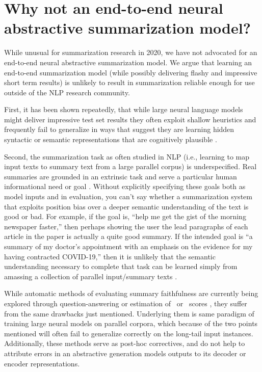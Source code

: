 \section{Why not an end-to-end neural abstractive summarization model?}

While unusual for summarization research in 2020, we have not advocated for an
end-to-end neural abstractive summarization model.  We argue that learning an
end-to-end summarization model (while possibly delivering flashy and
impressive short term results) is unlikely to result in summarization reliable
enough for use outside of the NLP research community.

First, it has been shown repeatedly, that while large neural language models
might deliver impressive test set results they often exploit shallow
heuristics and frequently fail to generalize in ways that suggest they are
learning hidden syntactic or semantic representations that are cognitively
plausible \citep{fodor1988,marcus2003,lake18,mccoy2019,linzen2020}.

Second, the summarization task as often studied in NLP (i.e., learning to map
input texts to summary text from a large parallel corpus) is underspecified.
Real summaries are grounded in an extrinsic task and serve a particular human
informational need or goal \citep{jones1999,mckeown2005}.  Without explicitly
specifying these goals both as model inputs and in evaluation, you can't say
whether a summarization system that exploits position bias over a deeper
semantic understanding of the text is good or bad. For example, if the goal
is, ``help me get the gist of the morning newspaper faster,'' then perhaps
showing the user the lead paragraphs of each article in the paper is actually
a quite good summary. If the intended goal is ``a summary of my doctor's
appointment with an emphasis on the evidence for my having contracted
COVID-19,'' then it is unlikely that the semantic understanding necessary to
complete that task can be learned simply from amassing a collection of
parallel input/summary texts \citep{bender2020,bisk2020}.

While automatic methods of evaluating summary faithfulness are currently being
explored through question-answering \citep{wang2020b,durmus2020} or estimation
of \rouge~or \bleu~scores \citep{zhang2020,sellam2020}, they suffer from the
same drawbacks just mentioned.  Underlying them is same paradigm of training
large neural models on parallel corpora, which because of the two points
mentioned will often fail to generalize correctly on the long-tail input
instances.  Additionally, these methods serve as post-hoc correctives, and do
not help to attribute errors in an abstractive generation models outputs to
its decoder or encoder representations.
